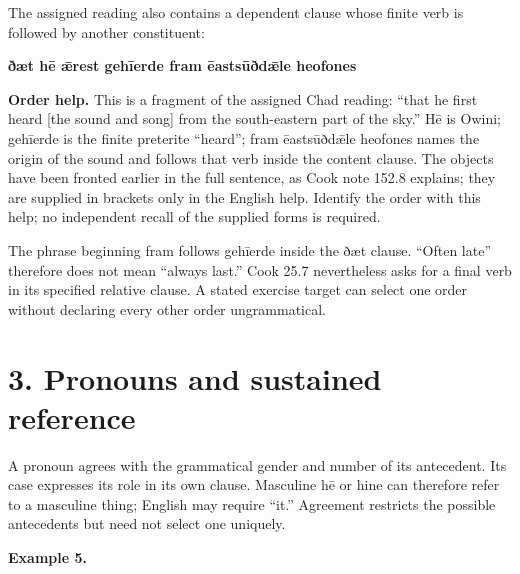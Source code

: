 The assigned reading also contains a dependent clause whose finite verb is followed by another constituent:

\textbf{ðæt hē ǣrest gehīerde fram ēastsūðdǣle heofones}

\textbf{Order help.} This is a fragment of the assigned Chad reading: “that he first heard [the sound and song] from the south-eastern part of the sky.” Hē is Owini; gehīerde is the finite preterite “heard”; fram ēastsūðdǣle heofones names the origin of the sound and follows that verb inside the content clause. The objects have been fronted earlier in the full sentence, as Cook note 152.8 explains; they are supplied in brackets only in the English help. Identify the order with this help; no independent recall of the supplied forms is required.

The phrase beginning fram follows gehīerde inside the ðæt clause. “Often late” therefore does not mean “always last.” Cook 25.7 nevertheless asks for a final verb in its specified relative clause. A stated exercise target can select one order without declaring every other order ungrammatical.

\section*{3. Pronouns and sustained reference}

A pronoun agrees with the grammatical gender and number of its antecedent. Its case expresses its role in its own clause. Masculine hē or hine can therefore refer to a masculine thing; English may require “it.” Agreement restricts the possible antecedents but need not select one uniquely.

\textbf{Example 5.}

